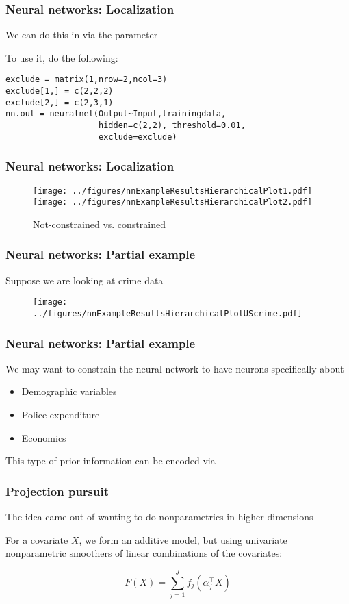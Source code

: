 \documentclass[12pt]{beamer}
\begin{document}
\begin{frame}[fragile]
\frametitle{Neural networks: Localization}
We can do this in  via the  parameter

\vsp
To use it, do the following:
\begin{verbatim}
exclude = matrix(1,nrow=2,ncol=3)
exclude[1,] = c(2,2,2)
exclude[2,] = c(2,3,1)
nn.out = neuralnet(Output~Input,trainingdata, 
                   hidden=c(2,2), threshold=0.01,
                   exclude=exclude)
\end{verbatim}
\end{frame}

\begin{frame}[fragile]
\frametitle{Neural networks: Localization}
\begin{figure}
\centering
\texttt{[image: ../figures/nnExampleResultsHierarchicalPlot1.pdf]}
\texttt{[image: ../figures/nnExampleResultsHierarchicalPlot2.pdf]}
\caption{Not-constrained vs. constrained}
\end{figure}

\end{frame}

\begin{frame}[fragile]
\frametitle{Neural networks: Partial example}
Suppose we are looking at crime data
\begin{figure}
\centering
\texttt{[image: ../figures/nnExampleResultsHierarchicalPlotUScrime.pdf]}
\end{figure}

\end{frame}

\begin{frame}[fragile]
\frametitle{Neural networks: Partial example}
We may want to constrain the neural network to have neurons specifically about
\begin{itemize}
\item Demographic variables 
\item Police expenditure
\item Economics
\end{itemize}
This type of prior information can be encoded via 

\end{frame}

\begin{frame}[fragile]
\frametitle{Projection pursuit}
The  idea came out of wanting to do nonparametrics in higher dimensions

\vsp
For a covariate $X$, we form an additive model, but using univariate nonparametric smoothers of linear combinations
of the covariates:

\[
F(X) = \sum_{j=1}^J f_j(\alpha_j^{\top} X)
\]
\end{frame}
\end{document}
